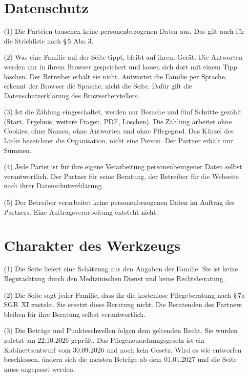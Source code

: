 \documentclass[fontsize=11pt,paper=a4,parskip=half]{scrartcl}
\begin{document}
\section{Datenschutz}
(1) Die Parteien tauschen keine personenbezogenen Daten aus. Das gilt auch für die
Strichliste nach §\,5 Abs.\,3.

(2) Was eine Familie auf der Seite tippt, bleibt auf ihrem Gerät. Die Antworten
werden nur in ihrem Browser gespeichert und lassen sich dort mit einem Tipp löschen.
Der Betreiber erhält sie nicht. Antwortet die Familie per Sprache, erkennt der
Browser die Sprache, nicht die Seite. Dafür gilt die Datenschutzerklärung des
Browserherstellers.

(3) Ist die Zählung eingeschaltet, werden nur Besuche und fünf Schritte gezählt
(Start, Ergebnis, weitere Fragen, PDF, Löschen). Die Zählung arbeitet ohne Cookies,
ohne Namen, ohne Antworten und ohne Pflegegrad. Das Kürzel des Links bezeichnet die
Organisation, nicht eine Person. Der Partner erhält nur Summen.

(4) Jede Partei ist für ihre eigene Verarbeitung personenbezogener Daten selbst
verantwortlich. Der Partner für seine Beratung, der Betreiber für die Webseite nach
ihrer Datenschutzerklärung.

(5) Der Betreiber verarbeitet keine personenbezogenen Daten im Auftrag des Partners.
Eine Auftragsverarbeitung entsteht nicht.

\section{Charakter des Werkzeugs}
(1) Die Seite liefert eine Schätzung aus den Angaben der Familie. Sie ist keine
Begutachtung durch den Medizinischen Dienst und keine Rechtsberatung.

(2) Die Seite sagt jeder Familie, dass ihr die kostenlose Pflegeberatung nach
§\,7a SGB~XI zusteht. Sie ersetzt diese Beratung nicht. Die Beratenden des Partners
bleiben für ihre Beratung selbst verantwortlich.

(3) Die Beträge und Punkteschwellen folgen dem geltenden Recht. Sie wurden zuletzt
am 22.10.2026 geprüft. Das Pflegeneuordnungsgesetz ist ein Kabinettsentwurf vom
30.09.2026 und noch kein Gesetz. Wird es wie entworfen beschlossen, ändern sich die
meisten Beträge ab dem 01.01.2027 und die Seite muss angepasst werden.
\end{document}
